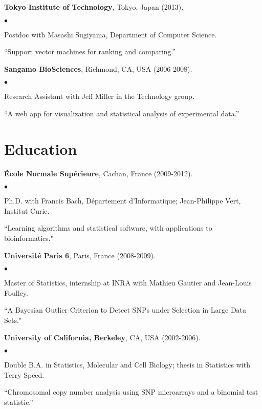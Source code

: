 \documentclass[margin,line]{res}
\newenvironment{list2}{
  \begin{list}{$\bullet$}{%
      \setlength{\itemsep}{0in}
      \setlength{\parsep}{0in} \setlength{\parskip}{0in}
      \setlength{\topsep}{0in} \setlength{\partopsep}{0in} 
      \setlength{\leftmargin}{0.2in}}}{\end{list}}
\begin{document}
\begin{resume}
{\bf Tokyo Institute of Technology}, Tokyo, Japan (2013).\\
\vspace*{-.1in}
\begin{list2}
\item[] Postdoc with Masashi Sugiyama, Department of Computer Science.
\item[] ``Support vector machines for ranking and comparing.''
\end{list2}

{\bf Sangamo BioSciences}, Richmond, CA, USA (2006-2008).\\
\vspace*{-.1in}
\begin{list2}
\item[] Research Assistant with Jeff Miller in the Technology group.
\item[] ``A web app for visualization and statistical analysis of experimental data.''
\end{list2}

\section{\sc Education}

{\bf \'{E}cole Normale Sup\'{e}rieure}, Cachan, France (2009-2012).\\
\vspace*{-.1in}
\begin{list2}
\item[] Ph.D. with Francis Bach, D\'{e}partement d'Informatique; Jean-Philippe Vert, Institut Curie.
\item[] ``Learning algorithms and statistical software, with applications to bioinformatics."
\end{list2}

{\bf Universit\'e Paris 6}, Paris, France (2008-2009).\\
\vspace*{-.1in}
\begin{list2}
\item[] Master of Statistics, internship at INRA with Mathieu Gautier and Jean-Louis Foulley.
\item[] ``A Bayesian Outlier Criterion to Detect SNPs under Selection in Large Data Sets."
\end{list2}

{\bf University of California, Berkeley}, CA, USA (2002-2006).\\
\vspace*{-.1in}
\begin{list2}
\item[] Double B.A. in Statistics, Molecular and Cell Biology; thesis in Statistics with Terry Speed.
\item[] ``Chromosomal copy number analysis using SNP microarrays and a binomial test statistic.'' 
\end{list2}


\end{resume}
\end{document}
